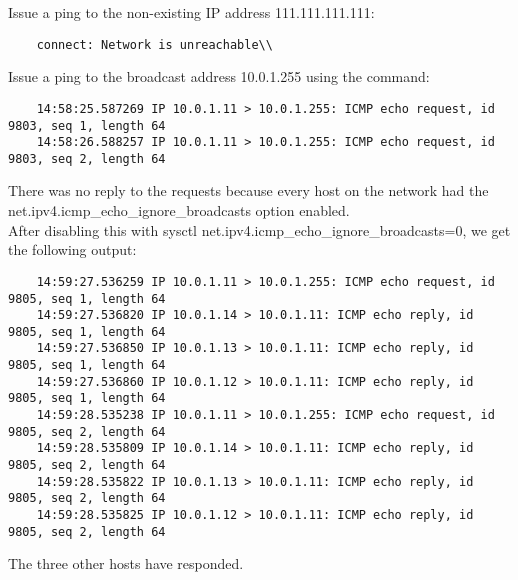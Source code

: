 Issue a ping to the non-existing IP address 111.111.111.111:\\
   \begin{lstlisting}  
    connect: Network is unreachable\\
\end{lstlisting}  
Issue a ping to the broadcast address 10.0.1.255 using the command:
\begin{lstlisting}  
    14:58:25.587269 IP 10.0.1.11 > 10.0.1.255: ICMP echo request, id 9803, seq 1, length 64
    14:58:26.588257 IP 10.0.1.11 > 10.0.1.255: ICMP echo request, id 9803, seq 2, length 64
\end{lstlisting}  
    There was no reply to the requests because every host on the network had the net.ipv4.icmp\_echo\_ignore\_broadcasts option enabled.\\
After disabling this with sysctl net.ipv4.icmp\_echo\_ignore\_broadcasts=0, we get the following output:
\begin{lstlisting}	  
	14:59:27.536259 IP 10.0.1.11 > 10.0.1.255: ICMP echo request, id 9805, seq 1, length 64
	14:59:27.536820 IP 10.0.1.14 > 10.0.1.11: ICMP echo reply, id 9805, seq 1, length 64
	14:59:27.536850 IP 10.0.1.13 > 10.0.1.11: ICMP echo reply, id 9805, seq 1, length 64
	14:59:27.536860 IP 10.0.1.12 > 10.0.1.11: ICMP echo reply, id 9805, seq 1, length 64
	14:59:28.535238 IP 10.0.1.11 > 10.0.1.255: ICMP echo request, id 9805, seq 2, length 64
	14:59:28.535809 IP 10.0.1.14 > 10.0.1.11: ICMP echo reply, id 9805, seq 2, length 64
	14:59:28.535822 IP 10.0.1.13 > 10.0.1.11: ICMP echo reply, id 9805, seq 2, length 64
	14:59:28.535825 IP 10.0.1.12 > 10.0.1.11: ICMP echo reply, id 9805, seq 2, length 64
\end{lstlisting}

The three other hosts have responded.
